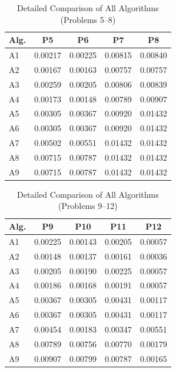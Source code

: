 \documentclass[11pt,a4paper]{article}
\begin{document}
\begin{table}[H]
\centering
\caption{Detailed Comparison of All Algorithms (Problems 5--8)}
\label{tab:detailed_comparison_2}
\begin{tabular}{lcccc}
\toprule
Alg. & P5 & P6 & P7 & P8 \\
\midrule
A1 & 0.00217 & 0.00225 & 0.00815 & 0.00840 \\
A2 & 0.00167 & 0.00163 & 0.00757 & 0.00757 \\
A3 & 0.00259 & 0.00205 & 0.00806 & 0.00839 \\
A4 & 0.00173 & 0.00148 & 0.00789 & 0.00907 \\
A5 & 0.00305 & 0.00367 & 0.00920 & 0.01432 \\
A6 & 0.00305 & 0.00367 & 0.00920 & 0.01432 \\
A7 & 0.00502 & 0.00551 & 0.01432 & 0.01432 \\
A8 & 0.00715 & 0.00787 & 0.01432 & 0.01432 \\
A9 & 0.00715 & 0.00787 & 0.01432 & 0.01432 \\
\bottomrule
\end{tabular}
\end{table}

\begin{table}[H]
\centering
\caption{Detailed Comparison of All Algorithms (Problems 9--12)}
\label{tab:detailed_comparison_3}
\begin{tabular}{lcccc}
\toprule
Alg. & P9 & P10 & P11 & P12 \\
\midrule
A1 & 0.00225 & 0.00143 & 0.00205 & 0.00057 \\
A2 & 0.00148 & 0.00137 & 0.00161 & 0.00036 \\
A3 & 0.00205 & 0.00190 & 0.00225 & 0.00057 \\
A4 & 0.00186 & 0.00168 & 0.00191 & 0.00057 \\
A5 & 0.00367 & 0.00305 & 0.00431 & 0.00117 \\
A6 & 0.00367 & 0.00305 & 0.00431 & 0.00117 \\
A7 & 0.00454 & 0.00183 & 0.00347 & 0.00551 \\
A8 & 0.00789 & 0.00756 & 0.00770 & 0.00179 \\
A9 & 0.00907 & 0.00799 & 0.00787 & 0.00165 \\
\bottomrule
\end{tabular}
\end{table}
\end{document}
